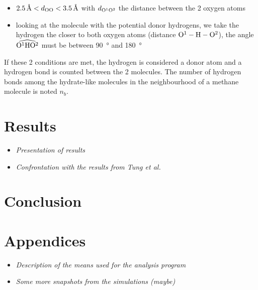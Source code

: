 \begin{itemize}
    \item $\SI{2.5}{\angstrom} < d_{\ce{O}\ce{O}} < \SI{3.5}{\angstrom}$ with $d_{\ce{O}^1\ce{O}^2}$ the distance between the 2 oxygen atoms 
    \item looking at the molecule with the potential donor hydrogens, we take the hydrogen the closer to both oxygen atoms (distance $\ce{O}^1-\ce{H}-\ce{O}^2$), the angle $\widehat{\ce{O}^1\ce{H}\ce{O}^2}$ must be between \SI{90}{\degree} and \SI{180}{\degree}
\end{itemize}
If these 2 conditions are met, the hydrogen is considered a donor atom and a hydrogen bond is counted between the 2 molecules. The number of hydrogen bonds among the hydrate-like molecules in the neighbourhood of a methane molecule is noted $n_b$.

\section{Results}
\begin{itemize}
    \item \textit{Presentation of results}
    \item \textit{Confrontation with the results from Tung et al. \cite{tung}}
\end{itemize}
\section{Conclusion}

\newpage
\nocite{*}
\begin{multicols}{2}
    [\center{\printbibheading}]
    \printbibliography[heading=none]
\end{multicols}

\newpage
\section{Appendices}
\begin{itemize}
    \item \textit{Description of the means used for the analysis program}
    \item \textit{Some more snapshots from the simulations (maybe)}
\end{itemize}
